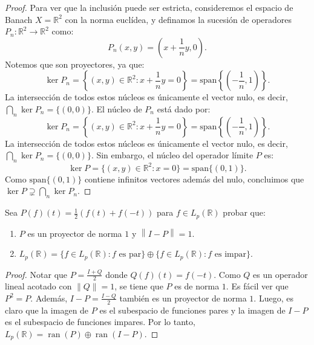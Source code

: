 \documentclass{article}
\theoremstyle{definition}
\newcommand{\R}{\mathbb{R}}
\newcommand{\norm}[1]{\left\lVert #1 \right\rVert}       %
\newenvironment{ejercicio}[1]{\begin{trivlist}
\item[\hskip \labelsep {\bfseries Ejercicio}\hskip \labelsep {\bfseries #1.}]}{\end{trivlist}}
\begin{document}
\begin{proof}
	Para ver que la inclusión puede ser estricta, consideremos el espacio de Banach \( X = \R^2 \) con la norma euclídea, y definamos la sucesión de operadores \( P_n : \R^2 \to \R^2 \) como:
	\[
		P_n(x,y) = \left( x + \frac{1}{n}y, 0 \right).
	\]
	Notemos que son proyectores, ya que:
	\[
		\ker P_n = \left \{ (x,y) \in \R^2 : x + \frac{1}{n}y = 0 \right \} = \text{span} \left \{ \left( -\frac{1}{n}, 1 \right) \right \}.
	\]
	La intersección de todos estos núcleos es únicamente el vector nulo, es decir, \( \bigcap_n \ker P_n = \{ (0,0) \} \).
	El núcleo de \( P_n \) está dado por:
	\[
		\ker P_n = \left \{ (x,y) \in \R^2 : x + \frac{1}{n}y = 0 \right \} = \text{span} \left \{ \left( -\frac{1}{n}, 1 \right) \right \}.
	\]
	La intersección de todos estos núcleos es únicamente el vector nulo, es decir, \( \bigcap_n \ker P_n = \{ (0,0) \} \).
	Sin embargo, el núcleo del operador límite \( P \) es:
	\[
		\ker P = \{ (x,y) \in \R^2 : x = 0 \} = \text{span}\{ (0,1) \}.
	\]
	Como \( \text{span}\{ (0,1) \} \) contiene infinitos vectores además del nulo, concluimos que \( \ker P \supsetneq \bigcap_n \ker P_n \).
\end{proof}

\begin{ejercicio}{6}
	Sea \( P(f)(t) = \frac{1}{2} (f(t) + f(-t)) \) para \( f \in L_p(\R) \) probar que:\begin{enumerate}
		\item \( P \) es un proyector de norma \( 1 \) y \( \norm{I - P} = 1 \).
		\item \( L_p(\R) = \{ f \in L_p(\R) : f \text{ es par} \} \oplus \{ f \in L_p(\R) : f \text{ es impar} \} \).
	\end{enumerate}
\end{ejercicio}
\begin{proof}
	Notar que \( P = \frac{I+Q}{2} \) donde \( Q(f)(t) = f(-t) \). Como \( Q \) es un operador lineal acotado con \( \norm{Q} = 1 \), se tiene que \( P \) es de norma \( 1 \). Es fácil ver que \( P^2 = P \). Además, \( I - P = \frac{I - Q}{2} \) también es un proyector de norma \( 1 \).
	Luego, es claro que la imagen de \( P \) es el subespacio de funciones pares y la imagen de \( I - P \) es el subespacio de funciones impares. Por lo tanto, \( L_p(\R) = \operatorname{ran}(P) \oplus \operatorname{ran}(I - P) \).
\end{proof}
\end{document}
